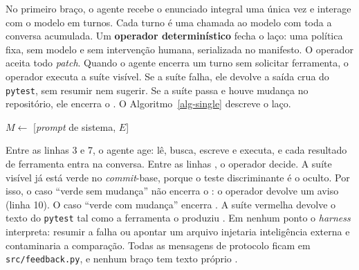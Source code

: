 No primeiro braço, o agente recebe o enunciado integral uma única vez e interage com o modelo em turnos. Cada turno é uma chamada ao modelo com toda a conversa acumulada. Um \textbf{operador determinístico} fecha o laço: uma política fixa, sem modelo e sem intervenção humana, serializada no manifesto. O operador aceita todo \textit{patch}. Quando o agente encerra um turno sem solicitar ferramenta, o operador executa a suíte visível. Se a suíte falha, ele devolve a saída crua do \texttt{pytest}, sem resumir nem sugerir. Se a suíte passa e houve mudança no repositório, ele encerra o . O Algoritmo~\ref{alg-single} descreve o laço.

\begin{algorithm}[ht!]
    \normalem
    $M \leftarrow$ [\textit{prompt} de sistema, $E$]\;
    \caption{Braço de agente único: laço do agente e política do operador.}
    \label{alg-single}
\end{algorithm}

Entre as linhas 3 e 7, o agente age: lê, busca, escreve e executa, e cada resultado de ferramenta entra na conversa. Entre as linhas , o operador decide. A suíte visível já está verde no \textit{commit}-base, porque o teste discriminante é o oculto. Por isso, o caso ``verde sem mudança'' não encerra o : o operador devolve um aviso (linha 10). O caso ``verde com mudança'' encerra . A suíte vermelha devolve o texto do \texttt{pytest} tal como a ferramenta o produziu . Em nenhum ponto o \textit{harness} interpreta: resumir a falha ou apontar um arquivo injetaria inteligência externa e contaminaria a comparação. Todas as mensagens de protocolo ficam em \texttt{src/feedback.py}, e nenhum braço tem texto próprio .

